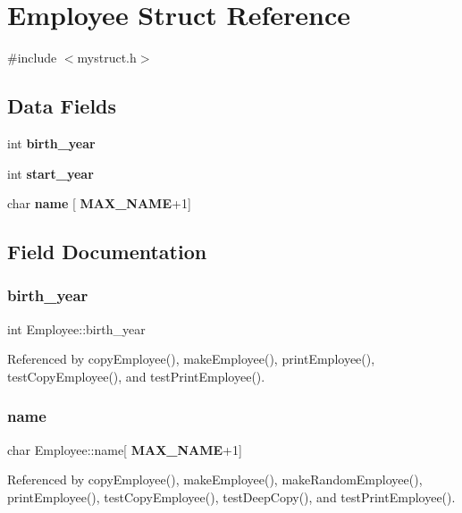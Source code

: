 \section{Employee Struct Reference}
\label{structEmployee}


{\ttfamily \#include $<$mystruct.\+h$>$}

\subsection*{Data Fields}
\begin{DoxyCompactItemize}
\item 
int \textbf{ birth\+\_\+year}
\item 
int \textbf{ start\+\_\+year}
\item 
char \textbf{ name} [\textbf{ M\+A\+X\+\_\+\+N\+A\+ME}+1]
\end{DoxyCompactItemize}


\subsection{Field Documentation}
\mbox{\label{structEmployee_a760204f198562c478aa489b14c7d1d29}} 
\subsubsection{birth\+\_\+year}
{\footnotesize\ttfamily int Employee\+::birth\+\_\+year}



Referenced by copy\+Employee(), make\+Employee(), print\+Employee(), test\+Copy\+Employee(), and test\+Print\+Employee().

\mbox{\label{structEmployee_acd7c4b846e2076017e5fe21ed23ac8dd}} 
\subsubsection{name}
{\footnotesize\ttfamily char Employee\+::name[\textbf{ M\+A\+X\+\_\+\+N\+A\+ME}+1]}



Referenced by copy\+Employee(), make\+Employee(), make\+Random\+Employee(), print\+Employee(), test\+Copy\+Employee(), test\+Deep\+Copy(), and test\+Print\+Employee().

\mbox{\label{structEmployee_a64042e9bd1a3451ba0349b59f21325a6}} 
